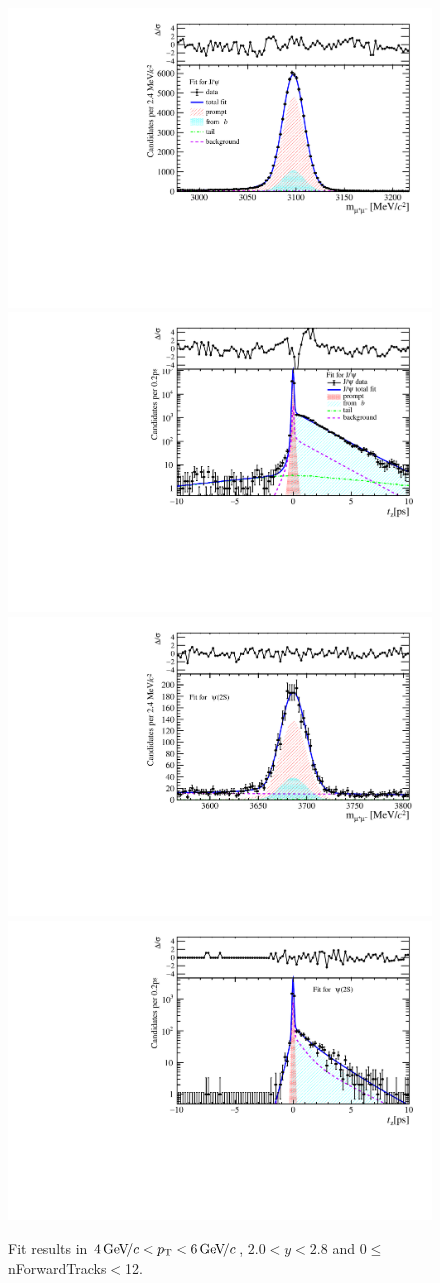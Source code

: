 \begin{figure}[H]
\begin{center}
\includegraphics[width=0.47\linewidth]{pdf/Jpsi/drawmassF/n1y1pt3.pdf}
\includegraphics[width=0.47\linewidth]{pdf/Jpsi/2DFitF/n1y1pt3.pdf}
\vspace*{-0.5cm}
\includegraphics[width=0.47\linewidth]{pdf/Psi2S/drawmassF/n1y1pt3.pdf}
\includegraphics[width=0.47\linewidth]{pdf/Psi2S/2DFitF/n1y1pt3.pdf}
\vspace*{-0.5cm}
\end{center}
\caption{Fit results in $4\text{\,Ge\kern -0.1em V\!/}c<p_{\mathrm{T}}<6\text{\,Ge\kern -0.1em V\!/}c$, $2.0<y<2.8$ and 0$\leq$nForwardTracks$<$12.}
\label{Fitn1y1pt3}
\end{figure}
